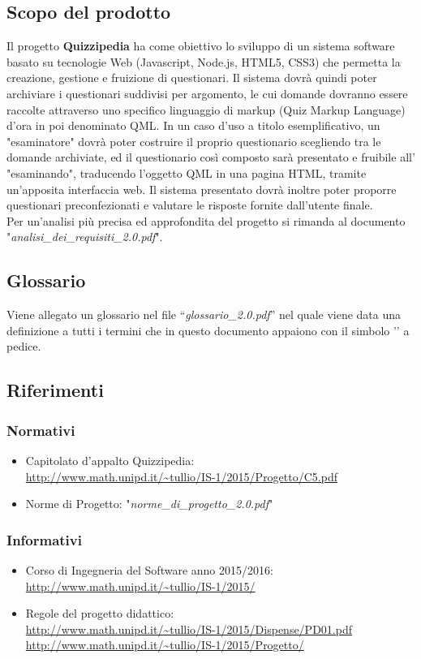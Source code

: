 \documentclass[a4paper,11pt]{article}
\begin{document}
	
	\subsection{Scopo del prodotto}
	Il progetto \textbf{Quizzipedia} ha come obiettivo lo sviluppo di un sistema software basato su tecnologie Web (Javascript\addglos, Node.js\addglos, HTML5\addglos, CSS3\addglos) che permetta la creazione, gestione e fruizione di questionari. Il sistema dovrà quindi poter archiviare i questionari suddivisi per argomento, le cui domande dovranno essere raccolte attraverso uno specifico linguaggio di markup (Quiz Markup Language) d'ora in poi denominato QML\addglos. In un caso d'uso a titolo esemplificativo, un "esaminatore" dovrà poter costruire il proprio questionario scegliendo tra le domande archiviate, ed il questionario così composto sarà presentato e fruibile all' "esaminando", traducendo l'oggetto QML in una pagina HTML\addglos, tramite un'apposita interfaccia web. Il sistema presentato dovrà inoltre poter proporre questionari preconfezionati e valutare le risposte fornite dall'utente finale.
	\\
	Per un'analisi più precisa ed approfondita del progetto si rimanda al documento\\ "\textit{analisi\_dei\_requisiti\_2.0.pdf}".
	\subsection{Glossario}
	Viene allegato un glossario nel file ``\textit{glossario\_2.0.pdf}'' nel quale viene data una definizione a tutti i termini che in questo documento appaiono con il simbolo '\addglos' a pedice.
	\subsection{Riferimenti}
		\subsubsection{Normativi}
		\begin{itemize}
			\item Capitolato d'appalto Quizzipedia:\\
			\url{http://www.math.unipd.it/~tullio/IS-1/2015/Progetto/C5.pdf}
			\item Norme di Progetto: "\textit{norme\_di\_progetto\_2.0.pdf}"
		\end{itemize}
		\subsubsection{Informativi}
		\begin{itemize}
			\item Corso di Ingegneria del Software anno 2015/2016:\\
			\url{http://www.math.unipd.it/~tullio/IS-1/2015/}
			\item Regole del progetto didattico:\\
			\url{http://www.math.unipd.it/~tullio/IS-1/2015/Dispense/PD01.pdf}
			\url{http://www.math.unipd.it/~tullio/IS-1/2015/Progetto/}\\
			\end{itemize}
	\pagebreak
	\newpage
\end{document}

